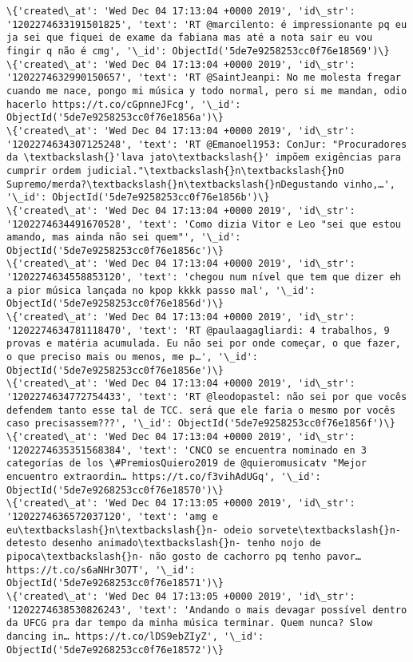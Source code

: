 \documentclass[11pt]{article}
\begin{document}
\begin{Verbatim}[commandchars=\\\{\}]
\{'created\_at': 'Wed Dec 04 17:13:04 +0000 2019', 'id\_str': '1202274633191501825', 'text': 'RT @marcilento: é impressionante pq eu ja sei que fiquei de exame da fabiana mas até a nota sair eu vou fingir q não é cmg', '\_id': ObjectId('5de7e9258253cc0f76e18569')\}
\{'created\_at': 'Wed Dec 04 17:13:04 +0000 2019', 'id\_str': '1202274632990150657', 'text': 'RT @SaintJeanpi: No me molesta fregar cuando me nace, pongo mi música y todo normal, pero si me mandan, odio hacerlo https://t.co/cGpnneJFcg', '\_id': ObjectId('5de7e9258253cc0f76e1856a')\}
\{'created\_at': 'Wed Dec 04 17:13:04 +0000 2019', 'id\_str': '1202274634307125248', 'text': 'RT @Emanoel1953: ConJur: "Procuradores da \textbackslash{}'lava jato\textbackslash{}' impõem exigências para cumprir ordem judicial."\textbackslash{}n\textbackslash{}nO Supremo/merda?\textbackslash{}n\textbackslash{}nDegustando vinho,…', '\_id': ObjectId('5de7e9258253cc0f76e1856b')\}
\{'created\_at': 'Wed Dec 04 17:13:04 +0000 2019', 'id\_str': '1202274634491670528', 'text': 'Como dizia Vitor e Leo "sei que estou amando, mas ainda não sei quem"', '\_id': ObjectId('5de7e9258253cc0f76e1856c')\}
\{'created\_at': 'Wed Dec 04 17:13:04 +0000 2019', 'id\_str': '1202274634558853120', 'text': 'chegou num nível que tem que dizer eh a pior música lançada no kpop kkkk passo mal', '\_id': ObjectId('5de7e9258253cc0f76e1856d')\}
\{'created\_at': 'Wed Dec 04 17:13:04 +0000 2019', 'id\_str': '1202274634781118470', 'text': 'RT @paulaagagliardi: 4 trabalhos, 9 provas e matéria acumulada. Eu não sei por onde começar, o que fazer, o que preciso mais ou menos, me p…', '\_id': ObjectId('5de7e9258253cc0f76e1856e')\}
\{'created\_at': 'Wed Dec 04 17:13:04 +0000 2019', 'id\_str': '1202274634772754433', 'text': 'RT @leodopastel: não sei por que vocês defendem tanto esse tal de TCC. será que ele faria o mesmo por vocês caso precisassem???', '\_id': ObjectId('5de7e9258253cc0f76e1856f')\}
\{'created\_at': 'Wed Dec 04 17:13:04 +0000 2019', 'id\_str': '1202274635351568384', 'text': 'CNCO se encuentra nominado en 3 categorías de los \#PremiosQuiero2019 de @quieromusicatv "Mejor encuentro extraordin… https://t.co/f3vihAdUGq', '\_id': ObjectId('5de7e9268253cc0f76e18570')\}
\{'created\_at': 'Wed Dec 04 17:13:05 +0000 2019', 'id\_str': '1202274636572037120', 'text': 'amg e eu\textbackslash{}n\textbackslash{}n- odeio sorvete\textbackslash{}n- detesto desenho animado\textbackslash{}n- tenho nojo de pipoca\textbackslash{}n- não gosto de cachorro pq tenho pavor… https://t.co/s6aNHr3O7T', '\_id': ObjectId('5de7e9268253cc0f76e18571')\}
\{'created\_at': 'Wed Dec 04 17:13:05 +0000 2019', 'id\_str': '1202274638530826243', 'text': 'Andando o mais devagar possível dentro da UFCG pra dar tempo da minha música terminar. Quem nunca? Slow dancing in… https://t.co/lDS9ebZIyZ', '\_id': ObjectId('5de7e9268253cc0f76e18572')\}

\end{Verbatim}
\end{document}
